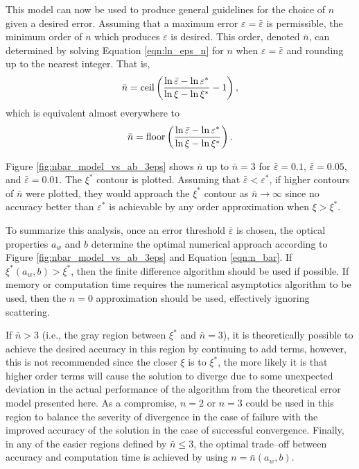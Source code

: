 This model can now be used to produce general guidelines for the choice of $n$ given a desired error.
Assuming that a maximum error $\varepsilon=\bar\varepsilon$ is permissible, the minimum order of $n$ which produces $\varepsilon$ is desired.
This order, denoted $\bar{n}$, can determined by solving Equation \eqref{eqn:ln_eps_n} for $n$ when $\varepsilon=\bar{\varepsilon}$ and rounding up to the nearest integer.
That is,
\begin{equation*}
  \bar{n} = \mbox{ceil}\left(\frac{\ln\bar{\varepsilon} - \ln\varepsilon^*}{\ln\xi - \ln\xi^*} - 1 \right),
\end{equation*}
which is equivalent almost everywhere to
\begin{equation}
  \label{eqn:n_bar}
  \bar{n} = \mbox{floor}\left(\frac{\ln\bar{\varepsilon} - \ln\varepsilon^*}{\ln\xi - \ln\xi^*}\right).
\end{equation}

Figure \ref{fig:nbar_model_vs_ab_3eps} shows $\bar{n}$ up to $\bar{n}=3$ for $\bar{\varepsilon}=0.1$, $\bar{\varepsilon}=0.05$, and $\bar{\varepsilon}=0.01$.
The $\xi^*$ contour is plotted.
Assuming that $\bar{\varepsilon}<\varepsilon^*$, if higher contours of $\bar{n}$ were plotted, they would approach the $\xi^*$ contour as $\bar{n} \to \infty$ since no accuracy better than $\varepsilon^*$ is achievable by any order approximation when $\xi > \xi^*$.

To summarize this analysis, once an error threshold $\bar{\varepsilon}$ is chosen, the optical properties $a_w$ and $b$ determine the optimal numerical approach according to Figure \ref{fig:nbar_model_vs_ab_3eps} and Equation \eqref{eqn:n_bar}.
If $\xi^*(a_w, b) > \xi^*$, then the finite difference algorithm should be used if possible.
If memory or computation time requires the numerical asymptotics algorithm to be used, then the $n=0$ approximation should be used, effectively ignoring scattering.

If $\bar{n}>3$ (i.e., the gray region between $\xi^*$ and $\bar{n}=3$), it is theoretically possible to achieve the desired accuracy in this region by continuing to add terms, however, this is not recommended since the closer $\xi$ is to $\xi^*$, the more likely it is that higher order terms will cause the solution to diverge due to some unexpected deviation in the actual performance of the algorithm from the theoretical error model presented here.
As a compromise, $n=2$ or $n=3$ could be used in this region to balance the severity of divergence in the case of failure with the improved accuracy of the solution in the case of successful convergence.
Finally, in any of the easier regions defined by $\bar{n} \leq 3$, the optimal trade--off between accuracy and computation time is achieved by using $n=\bar{n}(a_w, b)$.

